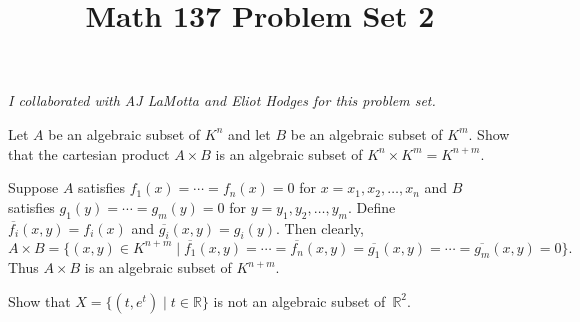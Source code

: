 \documentclass[11pt,letterpaper]{article}
\title{\textbf{Math 137 Problem Set 2}}
\begin{document}
\maketitle

\hr
\begin{center}
    \textit{I collaborated with AJ LaMotta and Eliot Hodges for this problem set.}
\end{center}
\hr

\begin{problem}
    Let $A$ be an algebraic subset of $K^n$ and let $B$ be an algebraic subset of $K^m$. Show that the cartesian product $A\times B$ is an algebraic subset of $K^n \times K^m = K^{n+m}$.
\end{problem}

\begin{solution}
    Suppose $A$ satisfies $f_1(x)=\cdots=f_n(x)=0$ for $x=x_1,x_2,\ldots,x_n$ and $B$ satisfies $g_1(y)=\cdots=g_m(y)=0$  for $y=y_1,y_2,\ldots,y_m$. Define $\overline{f_i}(x,y)=f_i(x)$ and $\overline{g_i}(x,y)=g_i(y)$. Then clearly,
    \[
        A\times B = \{(x,y)\in K^{n+m} \mid \overline{f_1}(x,y)=\cdots=\overline{f_n}(x,y)=\overline{g_1}(x,y)=\cdots=\overline{g_m}(x,y)=0\}
    .\]      
    Thus $A\times B$ is an algebraic subset of $K^{n+m}$.
\end{solution}

\begin{problem}
    Show that $X=\{(t,e^t)\mid t\in\mathbb R\}$ is not an algebraic subset of~$\mathbb R^2$. 
\end{problem}
\end{document}
